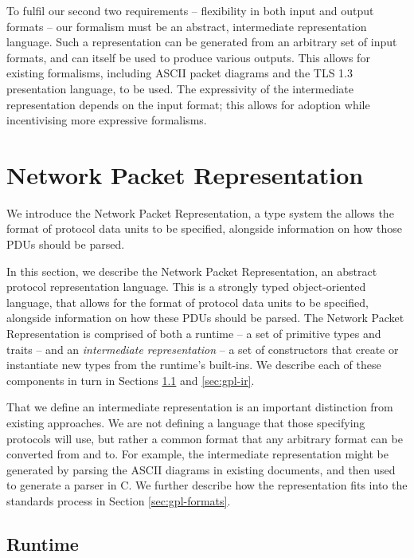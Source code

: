 \documentclass[10pt,sigconf]{acmart}
\begin{document}
To fulfil our second two requirements -- flexibility in both input and output formats --
our formalism must be an abstract, intermediate representation language. Such a
representation can be generated from an arbitrary set of input formats, and can itself be
used to produce various outputs. This allows for existing formalisms, including ASCII
packet diagrams and the TLS 1.3 presentation language, to be used. The expressivity
of the intermediate representation depends on the input format; this allows for adoption
while incentivising more expressive formalisms.

\section{Network Packet Representation}
\label{sec:gpl}

We introduce the Network Packet Representation, a type system the allows
the format of protocol data units to be specified, alongside information
on how those PDUs should be parsed.

In this section, we describe the Network Packet Representation, an abstract protocol
representation language. This is a strongly typed object-oriented language, that allows
for the format of protocol data units to be specified, alongside information on how these
PDUs should be parsed. The Network Packet Representation is comprised of both a runtime -- a set
of primitive types and traits -- and an \emph{intermediate representation} -- a set of
constructors that create or instantiate new types from the runtime's built-ins. We
describe each of these components in turn in Sections \ref{sec:gpl-runtime} and
\ref{sec:gpl-ir}.

That we define an intermediate representation is an important distinction from
existing approaches. We are not defining a language that those specifying protocols will
use, but rather a common format that any arbitrary format can be converted from and to.
For example, the intermediate representation might be generated by parsing the ASCII
diagrams in existing documents, and then used to generate a parser in C. We further
describe how the representation fits into the standards process in Section \ref{sec:gpl-formats}.

\subsection{Runtime}
\label{sec:gpl-runtime}
\end{document}
